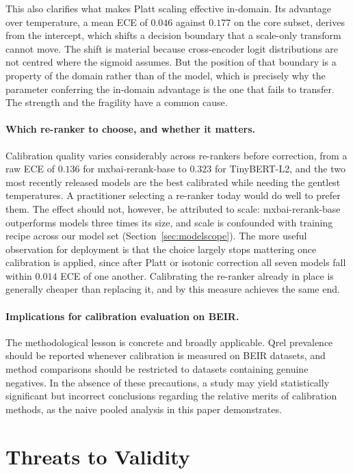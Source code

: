 \documentclass[sn-mathphys-num,pdflatex]{sn-jnl}
\begin{document}
This also clarifies what makes Platt scaling effective in-domain. Its advantage over
temperature, a mean ECE of $0.046$ against $0.177$ on the core subset, derives from
the intercept, which shifts a decision boundary that a scale-only transform cannot
move. The shift is material because cross-encoder logit distributions are not
centred where the sigmoid assumes. But the position of that boundary is a property
of the domain rather than of the model, which is precisely why the parameter
conferring the in-domain advantage is the one that fails to transfer. The strength
and the fragility have a common cause.

\paragraph{Which re-ranker to choose, and whether it matters.}
Calibration quality varies considerably across re-rankers before correction, from a
raw ECE of $0.136$ for mxbai-rerank-base to $0.323$ for TinyBERT-L2, and the two
most recently released models are the best calibrated while needing the gentlest
temperatures. A practitioner selecting a re-ranker today would do well to prefer
them. The effect should not, however, be attributed to scale: mxbai-rerank-base
outperforms models three times its size, and scale is confounded with training
recipe across our model set (Section~\ref{sec:modelscope}). The more useful
observation for deployment is that the choice largely stops mattering once
calibration is applied, since after Platt or isotonic correction all seven models
fall within $0.014$ ECE of one another. Calibrating the re-ranker already in place
is generally cheaper than replacing it, and by this measure achieves the same
end.

\paragraph{Implications for calibration evaluation on BEIR.}
The methodological lesson is concrete and broadly applicable. Qrel prevalence
should be reported whenever calibration is measured on BEIR datasets, and method
comparisons should be restricted to datasets containing genuine negatives. In the
absence of these precautions, a study may yield statistically significant but
incorrect conclusions regarding the relative merits of calibration methods, as the
naive pooled analysis in this paper demonstrates.

\section{Threats to Validity}\label{sec:threats}
\end{document}
